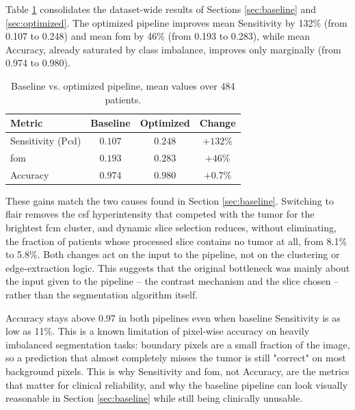 Table \ref{tab:comparison} consolidates the dataset-wide results of Sections \ref{sec:baseline} and \ref{sec:optimized}. The optimized pipeline improves mean Sensitivity by 132\% (from 0.107 to 0.248) and mean \gls{fom} by 46\% (from 0.193 to 0.283), while mean Accuracy, already saturated by class imbalance, improves only marginally (from 0.974 to 0.980).

\begin{table}[htbp]
\centering
\caption{Baseline vs. optimized pipeline, mean values over 484 patients.}
\label{tab:comparison}
\begin{tabular}{lccc}
\toprule
Metric & Baseline & Optimized & Change \\
\midrule
Sensitivity (Pcd) & $0.107$ & $0.248$ & $+132\%$ \\
\gls{fom} & $0.193$ & $0.283$ & $+46\%$ \\
Accuracy & $0.974$ & $0.980$ & $+0.7\%$ \\
\bottomrule
\end{tabular}
\end{table}

These gains match the two causes found in Section \ref{sec:baseline}. Switching to \gls{flair} removes the \gls{csf} hyperintensity that competed with the tumor for the brightest \gls{fcm} cluster, and dynamic slice selection reduces, without eliminating, the fraction of patients whose processed slice contains no tumor at all, from 8.1\% to 5.8\%. Both changes act on the input to the pipeline, not on the clustering or edge-extraction logic. This suggests that the original bottleneck was mainly about the input given to the pipeline -- the contrast mechanism and the slice chosen -- rather than the segmentation algorithm itself.

Accuracy stays above 0.97 in both pipelines even when baseline Sensitivity is as low as 11\%. This is a known limitation of pixel-wise accuracy on heavily imbalanced segmentation tasks: boundary pixels are a small fraction of the image, so a prediction that almost completely misses the tumor is still "correct" on most background pixels. This is why Sensitivity and \gls{fom}, not Accuracy, are the metrics that matter for clinical reliability, and why the baseline pipeline can look visually reasonable in Section \ref{sec:baseline} while still being clinically unusable.

